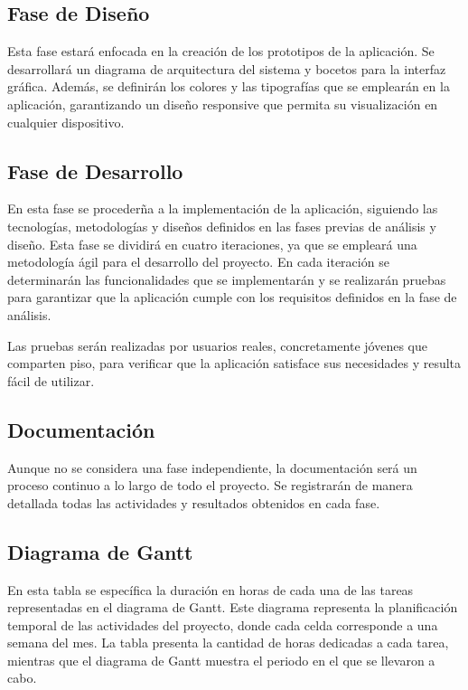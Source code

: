\subsection{Fase de Diseño}
Esta fase estará enfocada en la creación de los prototipos de la aplicación. Se desarrollará un diagrama de arquitectura del sistema y bocetos para la interfaz gráfica. Además, se definirán 
los colores y las tipografías que se emplearán en la aplicación, garantizando un diseño responsive que permita su visualización en cualquier dispositivo.

\subsection{Fase de Desarrollo}
En esta fase se procederña a la implementación de la aplicación, siguiendo las tecnologías, metodologías y diseños definidos en las fases previas de análisis y diseño. Esta fase se dividirá en cuatro iteraciones,
ya que se empleará una metodología ágil para el desarrollo del proyecto. En cada iteración se determinarán las funcionalidades que se implementarán y se realizarán pruebas para garantizar 
que la aplicación cumple con los requisitos definidos en la fase de análisis.

Las pruebas serán realizadas por usuarios reales, concretamente jóvenes que comparten piso, para verificar que la aplicación satisface sus necesidades y resulta fácil de utilizar.

\subsection{Documentación}
Aunque no se considera una fase independiente, la documentación será un proceso continuo a lo largo de todo el proyecto. Se registrarán de manera detallada todas las actividades y resultados obtenidos en cada fase. 

\subsection{Diagrama de Gantt}
En esta tabla se específica la duración en horas de cada una de las tareas representadas en el diagrama de Gantt. Este diagrama representa 
la planificación temporal de las actividades del proyecto, donde cada celda corresponde a una semana del mes. La tabla presenta la cantidad de horas
dedicadas a cada tarea, mientras que el diagrama de Gantt muestra el periodo en el que se llevaron a cabo. 


